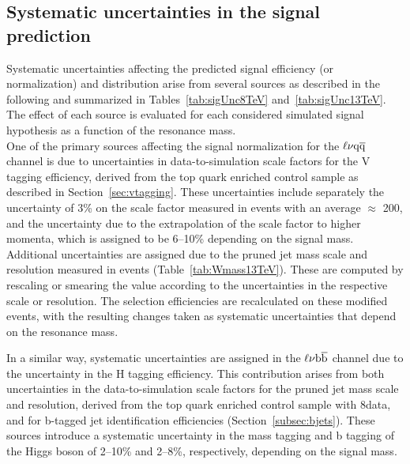 \subsection{Systematic uncertainties in the signal prediction}\label{subsec:uncSig}

Systematic uncertainties affecting the predicted signal efficiency (or normalization) and \mlvj distribution arise from several sources as described in the following and summarized in Tables~\ref{tab:sigUnc8TeV} and~\ref{tab:sigUnc13TeV}.
The effect of each source is evaluated for each considered simulated signal hypothesis as a function of the resonance mass.\\

One of the primary sources affecting the signal normalization for the $\ell\nu\mathrm{q}\overline{\mathrm{q}}$ channel is due to uncertainties in data-to-simulation scale factors for the V tagging efficiency, derived from the top quark enriched control sample as described in Section~\ref{sec:vtagging}. These uncertainties include separately the uncertainty of 3\% on the scale factor measured in \ttbar events with an average \pt $\approx$ 200\GeV, and the uncertainty due to the extrapolation of the scale factor to higher momenta, which is assigned to be 6--10\% depending on the signal mass. Additional uncertainties are assigned due to the pruned jet mass scale and resolution measured in \ttbar events (Table~\ref{tab:Wmass13TeV}). These are computed by rescaling or smearing the \mJ value according to the uncertainties in the respective \mJ scale or resolution. The selection efficiencies are recalculated on these modified events, with the resulting changes taken as systematic uncertainties that depend on the resonance mass.

In a similar way, systematic uncertainties are assigned in the $\ell\nu{\mathrm{b}\overline{\mathrm{b}}}$ channel due to the uncertainty in the H tagging efficiency. This contribution arises from both uncertainties in the data-to-simulation scale factors for the pruned jet mass scale and resolution, derived from the top quark enriched control sample with 8\TeV data, and for b-tagged jet identification efficiencies (Section~\ref{subsec:bjets}). These sources introduce a systematic uncertainty in the mass tagging and b tagging of the Higgs boson of 2--10\% and 2--8\%, respectively, depending on the signal mass.\\

